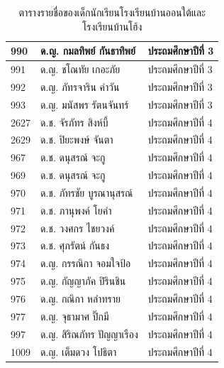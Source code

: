 \begin{table}[h]
\begin{center}
\begin{tabular}{ |p{3cm}|p{4cm}|p{3cm}| }
            \hline
            990 & ด.ญ. กมลทิพย์ กันธาทิพย์ & ประถมศึกษาปีที่ 3\\
            \hline
            991 & ด.ญ. ชโณทัย เกอะภัย & ประถมศึกษาปีที่ 3\\
            \hline
            992 & ด.ญ. ภัทรจาริน คำวัน & ประถมศึกษาปีที่ 3\\
            \hline
            993 & ด.ญ. มนัสพร รัตนจันทร์ & ประถมศึกษาปีที่ 3\\
            \hline
            2627 & ด.ช. จัรภัทร สิงห์บี้ & ประถมศึกษาปีที่ 4\\
            \hline
            2629 & ด.ช. ปิยะพงษ์ จันตา & ประถมศึกษาปีที่ 4\\
            \hline
            967 & ด.ช. ดนุสรณ์ จะกู & ประถมศึกษาปีที่ 4\\
            \hline
            969 & ด.ช. ดนุสรณ์ จะกู & ประถมศึกษาปีที่ 4\\
            \hline
            970 & ด.ช. ภัทรชัย บูรณานุสรณ์ & ประถมศึกษาปีที่ 4\\
            \hline
            971 & ด.ช. ภานุพงค์ โยคำ & ประถมศึกษาปีที่ 4\\
            \hline
            972 & ด.ช. วงศกร ไชยวงค์ & ประถมศึกษาปีที่ 4\\
            \hline
            973 & ด.ช. ศุภรัตน์ กันธง & ประถมศึกษาปีที่ 4\\
            \hline
            974 & ด.ญ. กรรณิกา จอมใจป้อ & ประถมศึกษาปีที่ 4\\
            \hline
            975 & ด.ญ. กัญญาภัค ปิรินชิน & ประถมศึกษาปีที่ 4\\
            \hline
            976 & ด.ญ. กณิกา หลำทราย & ประถมศึกษาปีที่ 4\\
            \hline
            977 & ด.ญ. จุธามาศ ปิ๊กมี & ประถมศึกษาปีที่ 4\\
            \hline
            997 & ด.ญ. สิริณภัทร ปัญญาเรือง & ประถมศึกษาปีที่ 4\\
            \hline
            1009 & ด.ญ. เต็มดวง โปธิตา & ประถมศึกษาปีที่ 4\\
            \hline
        \end{tabular}
    \end{center}
    \caption[ตารางรายชื่อของเด็กนักเรียนโรงเรียนบ้านออนใต้และโรงเรียนบ้านโฮ้ง]{ตารางรายชื่อของเด็กนักเรียนโรงเรียนบ้านออนใต้และโรงเรียนบ้านโฮ้ง}
    \label{studentstable}
\end{table}
